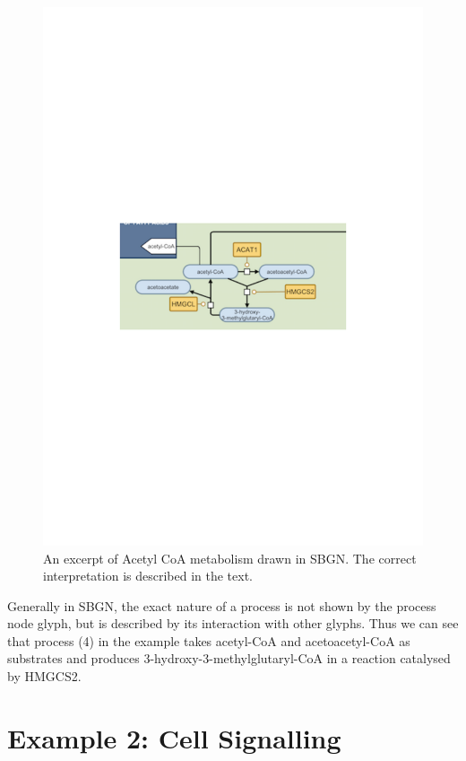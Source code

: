 \begin{figure}[htb]
\includegraphics[width=\linewidth,clip,trim=5cm 12cm 5cm 12.5cm]{worked_example_ideas/example1_1}
\caption{An excerpt of Acetyl CoA metabolism drawn in SBGN. The
  correct interpretation is described in the text.}
\label{fig:weg1}
\end{figure}

 Generally in SBGN, the exact nature of a process is not shown by the
process node glyph, but is described by its interaction with other
glyphs. Thus we can see that process (4) in the example takes
acetyl-CoA and acetoacetyl-CoA as substrates and produces
3-hydroxy-3-methylglutaryl-CoA in a reaction catalysed by HMGCS2.


\section{Example 2: Cell Signalling}

